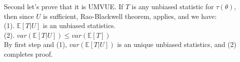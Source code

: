 Second let's prove that it is UMVUE. If $T$ is any unbiased statistic for $\tau(\theta)$, then since $U$ is sufficient, Rao-Blackwell theorem, applies, and we have:\\
(1). $\mathbb{E}[ T | U ]$ is an unbiased statistics.\\
(2). $var( \mathbb{E}[ T | U ] ) \leq var( \mathbb{E}[ T ] )$\\

By first step and (1), $var( \mathbb{E}[ T | U ] )$ is an unique unbiased statistics, and (2) completes proof.